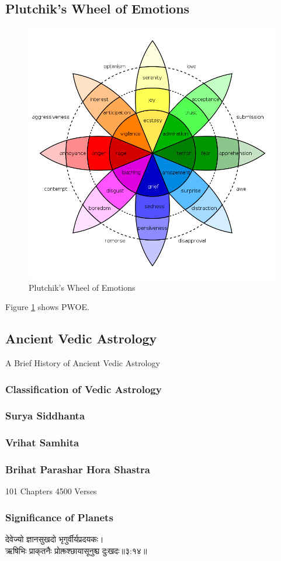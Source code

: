 \subsection{Plutchik's Wheel of Emotions}
\begin{figure}[H]
	\includegraphics[width=\columnwidth, keepaspectratio]{Plutchik'sWheelofEmotions.png}
	\caption{Plutchik's Wheel of Emotions}
	\label{Fig:fig1}
\end{figure}
Figure \ref{Fig:fig1} shows PWOE.
\subsection{Ancient Vedic Astrology}
A Brief History of Ancient Vedic Astrology
\subsubsection{Classification of Vedic Astrology}
\subsubsection{Surya Siddhanta}
\subsubsection{Vrihat Samhita}
\subsubsection{Brihat Parashar Hora Shastra}
101 Chapters
4500 Verses
\subsubsection{Significance of Planets}
\begin{sanskrit}
	\begin{center}
		देवेज्यो ज्ञानसुखदो भृगुर्वीर्यप्रदयकः।\\ऋषिभिः प्राक्‌तनैः प्रोक्तश्छायासूनुश्च दुःखदः॥३:१४॥\cite{BrihatParasharHoraShastraVol1}
	\end{center}
\end{sanskrit}
